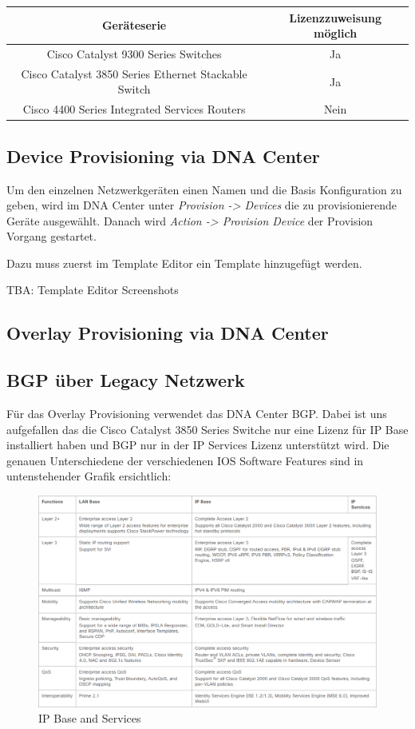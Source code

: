 \begin{tabular}{ | c | c | }
	\textbf{Geräteserie} & 	\textbf{Lizenzzuweisung möglich} \\
	\hline
	Cisco Catalyst 9300 Series Switches & Ja \\
	Cisco Catalyst 3850 Series Ethernet Stackable Switch & Ja \\
	Cisco 4400 Series Integrated Services Routers & Nein \\
\end{tabular}

\subsection{Device Provisioning via DNA Center}
Um den einzelnen Netzwerkgeräten einen Namen und die Basis Konfiguration zu geben, wird im DNA Center unter \textit{Provision -> Devices} die zu provisionierende Geräte ausgewählt. Danach wird \textit{Action -> Provision Device} der Provision Vorgang gestartet.

Dazu muss zuerst im Template Editor ein Template hinzugefügt werden.

TBA: Template Editor Screenshots


\subsection{Overlay Provisioning via DNA Center}


\subsection{BGP über Legacy Netzwerk}

Für das Overlay Provisioning verwendet das DNA Center BGP. Dabei ist uns aufgefallen das die Cisco Catalyst 3850 Series Switche nur eine Lizenz für IP Base installiert haben und BGP nur in der IP Services Lizenz unterstützt wird. Die genauen Unterschiedene der verschiedenen IOS Software Features sind in untenstehender Grafik ersichtlich\cite{cisco-3850-faq}:

\begin{figure}[H]
	\centering
	\includegraphics[width=16cm]{img/IPBaseServices.png}
	\caption{IP Base and Services}
	\label{fig:IP Base and Services}
\end{figure}

